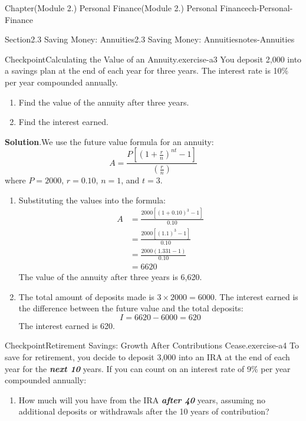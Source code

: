 \documentclass[oneside,10pt,]{book}
\newcommand{\blocktitlefont}{\relax}
\newcommand{\alert}[1]{\textbf{\textit{#1}}}
\newcommand{\amp}{&}
\begin{document}
\begin{chapterptx}{Chapter}{(Module 2.) Personal Finance}{}{(Module 2.) Personal Finance}{}{}{ch-Personal-Finance}
\begin{sectionptx}{Section}{2.3 Saving Money: Annuities}{}{2.3 Saving Money: Annuities}{}{}{notes-Annuities}
\begin{inlineexercise}{Checkpoint}{Calculating the Value of an Annuity.}{exercise-a3}
You deposit \textdollar{}2,000 into a savings plan at the end of each year for three years. The interest rate is 10\% per year compounded annually.%
%
\begin{enumerate}[label={\arabic*}]
\item{}Find the value of the annuity after three years.%
\item{}Find the interest earned.%
\end{enumerate}
\par\smallskip%
\noindent\textbf{\blocktitlefont Solution}.\hypertarget{exercise-a3-3}{}\quad{}We use the future value formula for an annuity:%
\begin{equation*}
A = \frac{P\left[\left(1+\frac{r}{n}\right)^{nt}-1\right]}{\left(\frac{r}{n}\right)}
\end{equation*}
where \(P = 2000\), \(r = 0.10\), \(n = 1\), and \(t = 3\).%
%
\begin{enumerate}[label={\arabic*}]
\item{}Substituting the values into the formula:%
\begin{align*}
A \amp = \frac{2000\left[(1 + 0.10)^{3} - 1\right]}{0.10}\\
\amp = \frac{2000\left[(1.1)^{3} - 1\right]}{0.10}\\
\amp = \frac{2000(1.331 - 1)}{0.10}\\
\amp = 6620
\end{align*}
The value of the annuity after three years is \textdollar{}6,620.%
\item{}The total amount of deposits made is \(3 \times 2000 = 6000\). The interest earned is the difference between the future value and the total deposits:%
\begin{equation*}
I = 6620 - 6000 = 620
\end{equation*}
The interest earned is \textdollar{}620.%
\end{enumerate}
\end{inlineexercise}%
\begin{inlineexercise}{Checkpoint}{Retirement Savings: Growth After Contributions Cease.}{exercise-a4}%
To save for retirement, you decide to deposit \textdollar{}3,000 into an IRA at the end of each year for the \alert{next 10} years. If you can count on an interest rate of 9\% per year compounded annually:%
%
\begin{enumerate}[label={\arabic*}]
\item{}How much will you have from the IRA \alert{after 40} years, assuming no additional deposits or withdrawals after the 10 years of contribution?%

\end{enumerate}
\end{inlineexercise}
\end{sectionptx}
\end{chapterptx}
\end{document}
